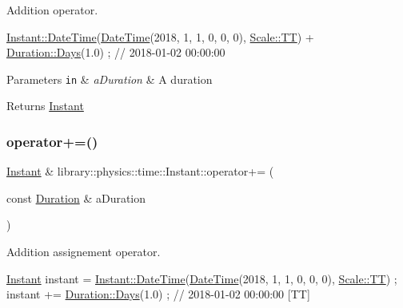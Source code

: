 Addition operator. 


\begin{DoxyCode}
\hyperlink{classlibrary_1_1physics_1_1time_1_1_instant_ac827b6ffa57ce75a3c56c462d4c872f8}{Instant::DateTime}(\hyperlink{classlibrary_1_1physics_1_1time_1_1_instant_ac827b6ffa57ce75a3c56c462d4c872f8}{DateTime}(2018, 1, 1, 0, 0, 0), 
      \hyperlink{namespacelibrary_1_1physics_1_1time_a09d2bc9fbc7b0b5f92e1419bd655e6bbadf1f3edb9115acb0a1e04209b7a9937b}{Scale::TT}) + \hyperlink{classlibrary_1_1physics_1_1time_1_1_duration_abf1323fa113b5203747ce9aec5c969fc}{Duration::Days}(1.0) ; \textcolor{comment}{// 2018-01-02 00:00:00}
\end{DoxyCode}



\begin{DoxyParams}[1]{Parameters}
\mbox{\tt in}  & {\em a\+Duration} & A duration \\
\hline
\end{DoxyParams}
\begin{DoxyReturn}{Returns}
\hyperlink{classlibrary_1_1physics_1_1time_1_1_instant}{Instant} 
\end{DoxyReturn}
\mbox{\label{classlibrary_1_1physics_1_1time_1_1_instant_a91febb93e31d68b4fe02910f0dbfa365}} 
\subsubsection{\texorpdfstring{operator+=()}{operator+=()}}
{\footnotesize\ttfamily \hyperlink{classlibrary_1_1physics_1_1time_1_1_instant}{Instant} \& library\+::physics\+::time\+::\+Instant\+::operator+= (\begin{DoxyParamCaption}\item[{const \hyperlink{classlibrary_1_1physics_1_1time_1_1_duration}{Duration} \&}]{a\+Duration }\end{DoxyParamCaption})}



Addition assignement operator. 


\begin{DoxyCode}
\hyperlink{classlibrary_1_1physics_1_1time_1_1_instant_a7916a9d8acb9de4eda35f9d72086a618}{Instant} instant = \hyperlink{classlibrary_1_1physics_1_1time_1_1_instant_ac827b6ffa57ce75a3c56c462d4c872f8}{Instant::DateTime}(\hyperlink{classlibrary_1_1physics_1_1time_1_1_instant_ac827b6ffa57ce75a3c56c462d4c872f8}{DateTime}(2018, 1, 1, 0, 0, 0), 
      \hyperlink{namespacelibrary_1_1physics_1_1time_a09d2bc9fbc7b0b5f92e1419bd655e6bbadf1f3edb9115acb0a1e04209b7a9937b}{Scale::TT}) ;
instant += \hyperlink{classlibrary_1_1physics_1_1time_1_1_duration_abf1323fa113b5203747ce9aec5c969fc}{Duration::Days}(1.0) ; \textcolor{comment}{// 2018-01-02 00:00:00 [TT]}
\end{DoxyCode}



